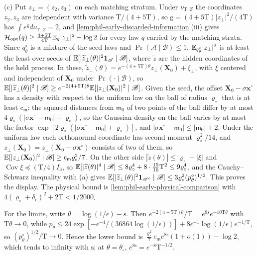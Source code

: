 (c) Put \(z_\perp=(z_2,z_3)\) on each matching stratum. Under
\(\nu_{\mathrm T,Z}\) the coordinates \(z_2,z_3\) are independent with
variance \(\mathrm T/(4+5\mathrm T)\), so
\(\mathrm g=(4+5\mathrm T)|z_\perp|^2/(4\mathrm T)\) has
\(\int e^{\mathrm g}d\nu_{\mathrm T,Z}=2\), and
\cref{lem:phil-early-discarded-information}(iii) gives
\(\mathcal H_{\mathrm{opt}}(q)\ge\frac{4+5\mathrm T}{4\mathrm T}
\mathbb E_q|z_\perp|^2-\log2\) for every law \(q\) carried by the matching strata.
Since \(q^\circ_\theta\) is a mixture of the seed laws and
\(\Pr(\mathscr A\mid\mathscr B)\le1\),
\(\mathbb E_{q^\circ_\theta}|z_\perp|^2\) is at least the least over seeds of
\(\mathbb E[|\widetilde z_\perp(\theta)|^2\mathbf 1_{\mathscr A}\mid\mathscr B]\),
where \(\widetilde z\) are the hidden coordinates of the held process. In
these, \(\widetilde z_\perp(\theta)=e^{-(4+5\mathrm T)\theta}z_\perp(\mathbf X_0)
+\xi_\perp\), with \(\xi\) centered and independent of \(\mathbf X_0\) under
\(\Pr(\cdot\mid\mathscr B)\), so
\(\mathbb E[|\widetilde z_\perp(\theta)|^2\mid\mathscr B]\ge
e^{-2(4+5\mathrm T)\theta}\mathbb E[|z_\perp(\mathbf X_0)|^2\mid\mathscr B]\). Given
the seed, the offset \(\mathbf X_0-\sigma\mathbf x^\circ\) has a density with
respect to the uniform law on the ball of radius \(\varrho_\circ\) that is at
least \(\mathrm c_{\mathsf m}\): the squared distances from \(\mathsf m_0\)
of two points of the ball differ by at most
\(4\varrho_\circ(|\sigma\mathbf x^\circ-\mathsf m_0|+\varrho_\circ)\), so the
Gaussian density on the ball varies by at most the factor
\(\exp[2\varrho_\circ(|\sigma\mathbf x^\circ-\mathsf m_0|+\varrho_\circ)]\),
and \(|\sigma\mathbf x^\circ-\mathsf m_0|\le|\mathsf m_0|+2\). Under the uniform law each orthonormal coordinate has
second moment \(\varrho_\circ^2/14\), and
\(z_\perp(\mathbf X_0)=z_\perp(\mathbf X_0-\sigma\mathbf x^\circ)\) consists
of two of them, so
\(\mathbb E[|z_\perp(\mathbf X_0)|^2\mid\mathscr B]\ge
\mathrm c_{\mathsf m}\varrho_\circ^2/7\). On the other side
\(|\widetilde z(\theta)|\le\varrho_\circ+|\xi|\) and
\(\operatorname{Cov}\xi\preceq(\mathrm T/4)I_3\), so
\(\mathbb E[|\widetilde z(\theta)|^4\mid\mathscr B]\le8\varrho_\circ^4
+8\cdot\frac{15}{16}\mathrm T^2\le9\varrho_\circ^4\), and the Cauchy--Schwarz
inequality with (a) gives
\(\mathbb E[|\widetilde z_\perp(\theta)|^2\mathbf 1_{\mathscr A^c}\mid\mathscr B]\le
3\varrho_\circ^2(p^\circ_\theta)^{1/2}\). This proves the display. The
physical bound is \cref{lem:phil-early-physical-comparison} with
\(4(\varrho_\circ+\delta_\epsilon)^2+2\mathrm T<1/2000\).

For the limits, write \(\theta=\log(1/\epsilon)-\mathrm s\). Then
\(e^{-2(4+5\mathrm T)\theta}/\mathrm T=e^{8\mathrm s}e^{-10\mathrm T\theta}\)
with \(\mathrm T\theta\to0\), while
\(p^\circ_\theta\le24\exp[-\epsilon^{-4}/(36864\log(1/\epsilon))]
+8\epsilon^{-1}\log(1/\epsilon)e^{-1/\mathrm T}\), so
\((p^\circ_\theta)^{1/2}/\mathrm T\to0\). Hence the lower bound is
\(\frac{\varrho_\circ^2}7\mathrm c_{\mathsf m}e^{8\mathrm s}(1+o(1))-\log2\),
which tends to infinity with \(\mathrm s\); at \(\theta=\theta_\circ\),
\(e^{8\mathrm s}=e^{-8}\mathrm T^{-1/2}\).

